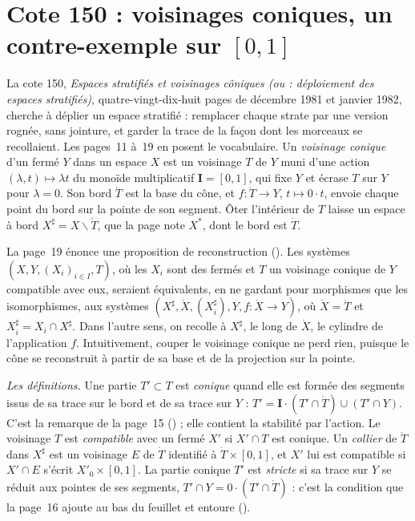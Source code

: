 \section[Cote 150 : voisinages coniques, un contre-exemple sur {[0, 1]}]{Cote 150 : voisinages coniques, un contre-exemple sur $[0, 1]$\protect{}}\label{sec:150}

La cote 150, \emph{Espaces stratifiés et voisinages côniques (ou : déploiement des espaces stratifiés)}, quatre-vingt-dix-huit pages de décembre 1981 et janvier 1982, cherche à déplier un espace stratifié : remplacer chaque strate par une version rognée, sans jointure, et garder la trace de la façon dont les morceaux se recollaient. Les pages~11 à~19 en posent le vocabulaire. Un \emph{voisinage conique} d'un fermé $Y$ dans un espace $X$ est un voisinage $T$ de $Y$ muni d'une action $(\lambda, t) \mapsto \lambda t$ du monoïde multiplicatif $\mathbf I = [0, 1]$, qui fixe $Y$ et écrase $T$ sur $Y$ pour $\lambda = 0$. Son bord $\dot T$ est la base du cône, et $f : \dot T \to Y$, $t \mapsto 0 \cdot t$, envoie chaque point du bord sur la pointe de son segment. Ôter l'intérieur de $T$ laisse un espace à bord $X^\sharp = X \smallsetminus \mathring T$, que la page note $X^{*}$, dont le bord est $\dot T$.

La page~19 énonce une proposition de reconstruction (). Les systèmes $(X, Y, (X_i)_{i \in I}, T)$, où les $X_i$ sont des fermés et $T$ un voisinage conique de $Y$ compatible avec eux, seraient équivalents, en ne gardant pour morphismes que les isomorphismes, aux systèmes $(X^\sharp, \dot X, (X_i^\sharp), Y, f : \dot X \to Y)$, où $\dot X = \dot T$ et $X_i^\sharp = X_i \cap X^\sharp$. Dans l'autre sens, on recolle à $X^\sharp$, le long de $\dot X$, le cylindre de l'application $f$. Intuitivement, couper le voisinage conique ne perd rien, puisque le cône se reconstruit à partir de sa base et de la projection sur la pointe.

\noindent\emph{Les définitions.} Une partie $T' \subset T$ est \emph{conique} quand elle est formée des segments issus de sa trace sur le bord et de sa trace sur $Y$ : $T' = \mathbf I \cdot (T' \cap \dot T) \cup (T' \cap Y)$. C'est la remarque de la page~15 () ; elle contient la stabilité par l'action. Le voisinage $T$ est \emph{compatible} avec un fermé $X'$ si $X' \cap T$ est conique. Un \emph{collier} de $\dot T$ dans $X^\sharp$ est un voisinage $E$ de $\dot T$ identifié à $\dot T \times [0, 1]$, et $X'$ lui est compatible si $X' \cap E$ s'écrit $X'_0 \times [0, 1]$. La partie conique $T'$ est \emph{stricte} si sa trace sur $Y$ se réduit aux pointes de ses segments, $T' \cap Y = 0 \cdot (T' \cap \dot T)$ : c'est la condition que la page~16 ajoute au bas du feuillet et entoure ().

